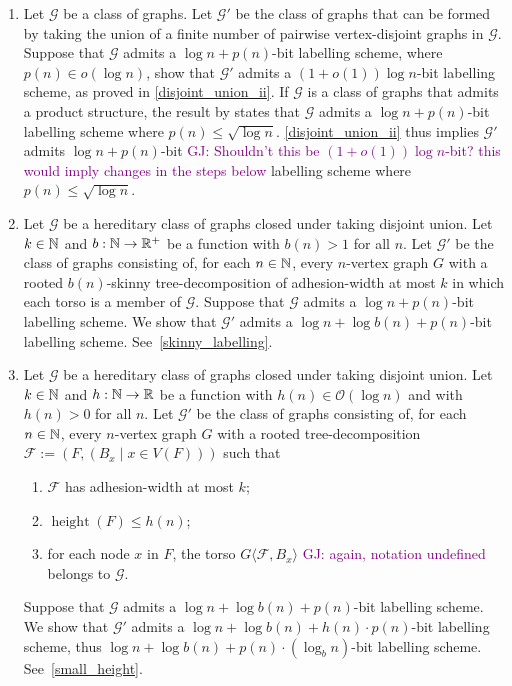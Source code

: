 \documentclass{patmorin}
\renewcommand{\le}{\leqslant}
\renewcommand{\leq}{\leqslant}
\newcommand{\gwen}[1]{\noindent\textcolor{Purple}{GJ: #1}}
\newcommand{\torso}[2]{{#1}\langle{#2}\rangle}
\DeclareMathOperator{\height}{height}
\newcommand{\Oh}{\mathcal{O}}
\begin{document}
\begin{enumerate}[label=\rm(2\alph*)]
\item \label{step:union-closed}
Let $\mathcal{G}$ be a class of graphs.
Let $\mathcal{G}'$ be the class of graphs that can be formed by taking the union of a finite number of pairwise vertex-disjoint graphs in $\mathcal{G}$.
    Suppose that $\mathcal{G}$ admits a $\log n + p(n)$-bit labelling scheme, where $p(n)\in o(\log n)$, show that $\mathcal{G}'$ admits a $(1+o(1))\log n$-bit labelling scheme, as proved in \cref{disjoint_union_ii}.    If  $\mathcal{G}$ is a class of graphs that admits a product structure, the result by \citet{dujmovic.esperet.ea:adjacency} states that $\mathcal{G}$ admits a $\log n + p(n)$-bit labelling scheme where $p(n)\leq \sqrt{\log n}$. \cref{disjoint_union_ii} thus implies $\mathcal{G}'$  admits $\log n + p(n)$-bit 
    \gwen{Shouldn't this be $(1+o(1))\log n$-bit? this would imply changes in the steps below} labelling scheme where $p(n)\leq \sqrt{\log n}$.
    
\item \label{step:skinny-tree-decomposition}
Let $\mathcal{G}$ be a hereditary class of graphs closed under taking disjoint union.
    Let $k\in\mathbb{N}$ and $b:\mathbb{N}\to\mathbb{R}^+$ be a function with $b(n)>1$ for all $n$.
    Let $\mathcal{G}'$ be the class of graphs consisting of, for each $n\in\mathbb{N}$, every $n$-vertex graph $G$ with a rooted $b(n)$-skinny tree-decomposition of adhesion-width at most $k$ in which each torso is a member of $\mathcal{G}$.
    Suppose that $\mathcal{G}$ admits a $\log n + p(n)$-bit labelling scheme. 
    We show that $\mathcal{G}'$ admits a $\log n +\log b(n) + p(n)$-bit labelling scheme. See~\cref{skinny_labelling}.
\item \label{step:short-tree-decompositions}
Let $\mathcal{G}$ be a hereditary class of graphs closed under taking disjoint union.
Let $k\in\mathbb{N}$ and  $h:\mathbb{N}\to\mathbb{R}$ be a function with $h(n)\in \Oh(\log n)$ and with $h(n)>0$ for all $n$.
Let $\mathcal{G'}$ be the class of graphs consisting of, for each $n\in\mathbb{N}$, every $n$-vertex graph $G$ with a rooted tree-decomposition $\mathcal{F}:=(F,(B_x \mid x\in V(F)))$ such that
    \begin{enumerate}[nosep,nolistsep,label=(\rm{\roman*)}]
      \item $\mathcal{F}$ has adhesion-width at most $k$;
      \item $\height(F)\le h(n)$;
      \item for each node $x$ in $F$, the torso $\torso{G}{\mathcal{F},B_x}$ \gwen{again, notation undefined} belongs to $\mathcal{G}$.
    \end{enumerate}
    Suppose that $\mathcal{G}$ admits a $\log n +\log b(n) + p(n)$-bit labelling scheme.
    We show that $\mathcal{G}'$ admits a $\log n +\log b(n) + h(n)\cdot p(n)$-bit labelling scheme, thus $\log n + \log b(n) + p(n)\cdot(\log_b n)$-bit labelling scheme. See~\cref{small_height}.
\end{enumerate}
\end{document}
